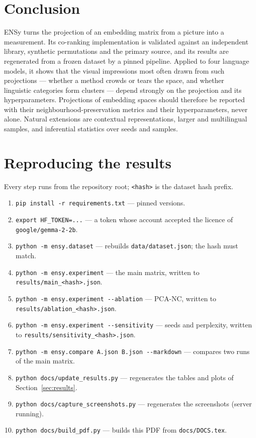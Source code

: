 \documentclass[conference,a4paper]{IEEEtran}
\begin{document}
\section{Conclusion}\label{sec:conclusion}

ENSy turns the projection of an embedding matrix from a picture into a
measurement. Its co-ranking implementation is validated against an
independent library, synthetic permutations and the primary source, and
its results are regenerated from a frozen dataset by a pinned pipeline.
Applied to four language models, it shows that the visual impressions
most often drawn from such projections --- whether a method crowds or
tears the space, and whether linguistic categories form clusters ---
depend strongly on the projection and its hyperparameters. Projections
of embedding spaces should therefore be reported with their
neighbourhood-preservation metrics and their hyperparameters, never
alone. Natural extensions are contextual representations, larger and
multilingual samples, and inferential statistics over seeds and samples.

\appendices

\section{Reproducing the results}\label{sec:app-reproducing}

Every step runs from the repository root; \texttt{<hash>} is the dataset
hash prefix.
\begin{enumerate}
\item \texttt{pip install -r requirements.txt} --- pinned versions.
\item \texttt{export HF\_TOKEN=...} --- a token whose account accepted the
  licence of \texttt{google/gemma-2-2b}.
\item \texttt{python -m ensy.dataset} --- rebuilds \texttt{data/dataset.json};
  the hash must match.
\item \texttt{python -m ensy.experiment} --- the main matrix, written to
  \texttt{results/main\_\textless{}hash\textgreater{}.json}.
\item \texttt{python -m ensy.experiment -{}-ablation} --- PCA-NC, written to
  \texttt{results/ablation\_\textless{}hash\textgreater{}.json}.
\item \texttt{python -m ensy.experiment -{}-sensitivity} --- seeds and
  perplexity, written to \texttt{results/sensitivity\_\textless{}hash\textgreater{}.json}.
\item \texttt{python -m ensy.compare A.json B.json -{}-markdown} --- compares
  two runs of the main matrix.
\item \texttt{python docs/update\_results.py} --- regenerates the tables and
  plots of Section~\ref{sec:results}.
\item \texttt{python docs/capture\_screenshots.py} --- regenerates the
  screenshots (server running).
\item \texttt{python docs/build\_pdf.py} --- builds this PDF from
  \texttt{docs/DOCS.tex}.
\end{enumerate}
\end{document}
